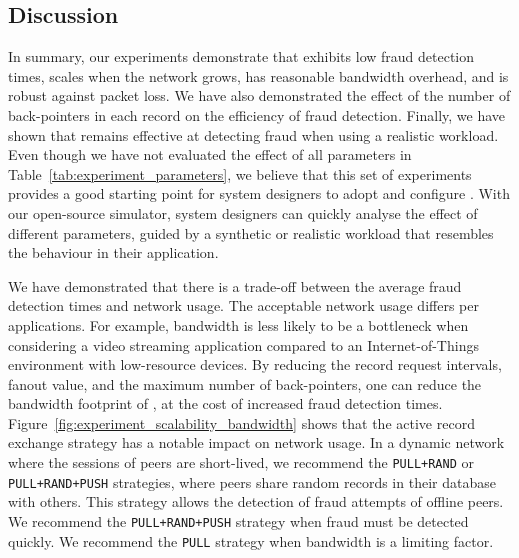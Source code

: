 \subsection{Discussion}
In summary, our experiments demonstrate that \ModelName{} exhibits low fraud detection times, scales when the network grows, has reasonable bandwidth overhead, and is robust against packet loss.
We have also demonstrated the effect of the number of back-pointers in each record on the efficiency of fraud detection.
Finally, we have shown that \ModelName{} remains effective at detecting fraud when using a realistic workload.
Even though we have not evaluated the effect of all parameters in Table~\ref{tab:experiment_parameters}, we believe that this set of experiments provides a good starting point for system designers to adopt and configure \ModelName{}.
With our open-source simulator, system designers can quickly analyse the effect of different parameters, guided by a synthetic or realistic workload that resembles the behaviour in their application.

We have demonstrated that there is a trade-off between the average fraud detection times and network usage.
The acceptable network usage differs per applications.
For example, bandwidth is less likely to be a bottleneck when considering a video streaming application compared to an Internet-of-Things environment with low-resource devices.
By reducing the record request intervals, fanout value, and the maximum number of back-pointers, one can reduce the bandwidth footprint of \ModelName{}, at the cost of increased fraud detection times.
Figure~\ref{fig:experiment_scalability_bandwidth} shows that the active record exchange strategy has a notable impact on network usage.
In a dynamic network where the sessions of peers are short-lived, we recommend the \texttt{PULL+RAND} or \texttt{PULL+RAND+PUSH} strategies, where peers share random records in their database with others.
This strategy allows the detection of fraud attempts of offline peers.
We recommend the \texttt{PULL+RAND+PUSH} strategy when fraud must  be detected quickly.
We recommend the \texttt{PULL} strategy when bandwidth is a limiting factor.

